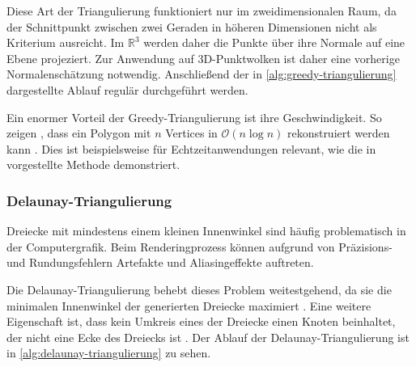 Diese Art der Triangulierung funktioniert nur im zweidimensionalen Raum, da der Schnittpunkt zwischen zwei Geraden in höheren Dimensionen nicht als Kriterium ausreicht.
Im $\mathbb{R}^3$ werden daher die Punkte über ihre Normale auf eine Ebene projeziert.
Zur Anwendung auf 3D-Punktwolken ist daher eine vorherige Normalenschätzung notwendig.
Anschließend der in \autoref{alg:greedy-triangulierung} dargestellte Ablauf regulär durchgeführt werden.

Ein enormer Vorteil der Greedy-Triangulierung ist ihre Geschwindigkeit.
So zeigen \citeauthor{berg2000comp}, dass ein Polygon mit $n$ Vertices in $\mathcal{O}(n \log n)$ rekonstruiert werden kann \cite[56--58]{berg2000comp}.
Dies ist beispielsweise für Echtzeitanwendungen relevant, wie die in \cite{Marton09ICRA} vorgestellte Methode demonstriert.


\subsubsection{Delaunay-Triangulierung}
\label{subsubsec:delaunay-triangulierung}

Dreiecke mit mindestens einem kleinen Innenwinkel sind häufig problematisch in der Computergrafik.
Beim Renderingprozess können aufgrund von Präzisions- und Rundungsfehlern Artefakte und Aliasingeffekte auftreten.

Die Delaunay-Triangulierung behebt dieses Problem weitestgehend, da sie die minimalen Innenwinkel der generierten Dreiecke maximiert \cite[199]{berg2000comp}.
Eine weitere Eigenschaft ist, dass kein Umkreis eines der Dreiecke einen Knoten beinhaltet, der nicht eine Ecke des Dreiecks ist \cite[196]{berg2000comp}. Der Ablauf der Delaunay-Triangulierung ist in \autoref{alg:delaunay-triangulierung} zu sehen.

